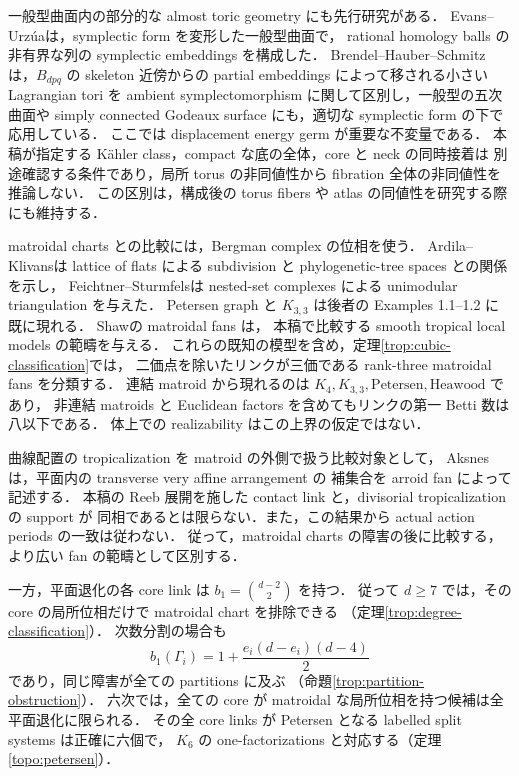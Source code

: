 一般型曲面内の部分的な almost toric geometry にも先行研究がある．
Evans--Urz\'ua\cite{EvansUrzua}は，symplectic form を変形した一般型曲面で，
rational homology balls の非有界な列の symplectic embeddings を構成した．
Brendel--Hauber--Schmitz\cite{BHS}は，$B_{dpq}$ の skeleton 近傍からの
partial embeddings によって移される小さい Lagrangian tori を
ambient symplectomorphism に関して区別し，一般型の五次曲面や
simply connected Godeaux surface にも，適切な symplectic form の下で応用している．
ここでは displacement energy germ が重要な不変量である．
本稿が指定する K\"ahler class，compact な底の全体，core と neck の同時接着は
別途確認する条件であり，局所 torus の非同値性から fibration 全体の非同値性を推論しない．
この区別は，構成後の torus fibers や atlas の同値性を研究する際にも維持する．

matroidal charts との比較には，Bergman complex の位相を使う．
Ardila--Klivans\cite{ArdilaKlivans}は lattice of flats による subdivision と
phylogenetic-tree spaces との関係を示し，
Feichtner--Sturmfels\cite[Theorem 4.1]{FeichtnerSturmfels}は
nested-set complexes による unimodular triangulation を与えた．
Petersen graph と $K_{3,3}$ は後者の Examples 1.1--1.2 に既に現れる．
Shaw\cite[\S2.4]{Shaw}の matroidal fans は，
本稿で比較する smooth tropical local models の範疇を与える．
これらの既知の模型を含め，定理\ref{trop:cubic-classification}では，
二価点を除いたリンクが三価である rank-three matroidal fans を分類する．
連結 matroid から現れるのは
$K_4,K_{3,3},\mathrm{Petersen},\mathrm{Heawood}$ であり，
非連結 matroids と Euclidean factors を含めてもリンクの第一 Betti 数は八以下である．
体上での realizability はこの上界の仮定ではない．

曲線配置の tropicalization を matroid の外側で扱う比較対象として，
Aksnes\cite[Theorem 4.15]{Aksnes}は，平面内の transverse very affine arrangement の
補集合を arroid fan によって記述する．
本稿の Reeb 展開を施した contact link と，divisorial tropicalization の support が
同相であるとは限らない．また，この結果から actual action periods の一致は従わない．
従って，matroidal charts の障害の後に比較する，より広い fan の範疇として区別する．

一方，平面退化の各 core link は
$b_1=\binom{d-2}{2}$ を持つ．
従って $d\geq7$ では，その core の局所位相だけで matroidal chart を排除できる
（定理\ref{trop:degree-classification}）．
次数分割の場合も
\[
 b_1(\Gamma_i)=1+\frac{e_i(d-e_i)(d-4)}2
\]
であり，同じ障害が全ての partitions に及ぶ
（命題\ref{trop:partition-obstruction}）．
六次では，全ての core が matroidal な局所位相を持つ候補は全平面退化に限られる．
その全 core links が Petersen となる labelled split systems は正確に六個で，
$K_6$ の one-factorizations と対応する（定理\ref{topo:petersen}）．

